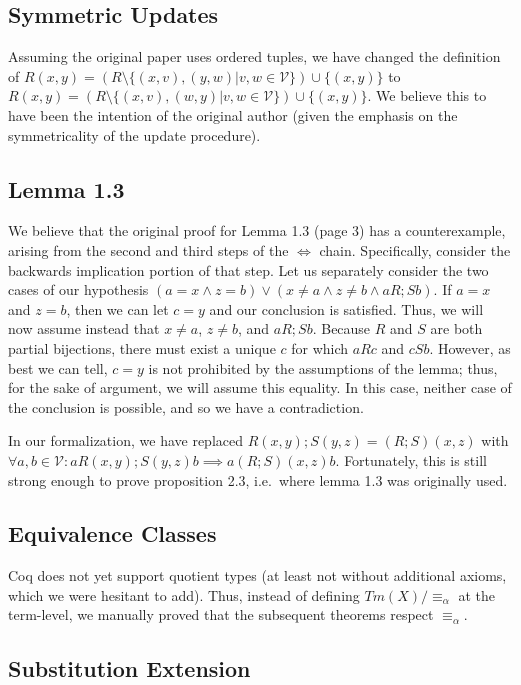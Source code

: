 \documentclass{article}
\begin{document}
\subsection{Symmetric Updates}

Assuming the original paper uses ordered tuples, we have changed the definition of $R(x,y) = (R
\setminus \{ (x,v),(y,w) | v,w \in \mathcal{V} \}) \cup \{ (x,y) \}$ to $R(x,y) = (R \setminus \{
(x,v),(w,y) | v,w \in \mathcal{V} \}) \cup \{ (x,y) \}$. We believe this to have been the intention
of the original author (given the emphasis on the symmetricality of the update procedure).

\subsection{Lemma 1.3}

We believe that the original proof for Lemma 1.3 (page 3) has a counterexample, arising from the second
and third steps of the $\iff$ chain. Specifically, consider the backwards implication portion of
that step. Let us separately consider the two cases of our hypothesis $(a = x \land z = b) \lor (x
\neq a \land z \neq b \land a R; S b)$. If $a = x$ and $z = b$, then we can let $c = y$ and our
conclusion is satisfied. Thus, we will now assume instead that $x \neq a$, $z \neq b$, and $a R; S b$.
Because $R$ and $S$ are both partial bijections, there must exist a unique $c$ for which $aRc$ and
$cSb$. However, as best we can tell, $c = y$ is not prohibited by the assumptions of the lemma;
thus, for the sake of argument, we will assume this equality. In this case, neither case of the
conclusion is possible, and so we have a contradiction.

In our formalization, we have replaced $R(x,y); S(y,z) = (R;S)(x,z)$ with $\forall a, b \in
\mathcal{V} : a R(x,y); S(y,z) b \implies a (R;S)(x,z) b$. Fortunately, this is still strong enough to
prove proposition 2.3, i.e.\ where lemma 1.3 was originally used.

\subsection{Equivalence Classes}

Coq does not yet support quotient types (at least not without additional axioms, which we were
hesitant to add). Thus, instead of defining $Tm(X)/\equiv_\alpha$ at the term-level, we manually
proved that the subsequent theorems respect $\equiv_\alpha$.

\subsection{Substitution Extension}
\end{document}

